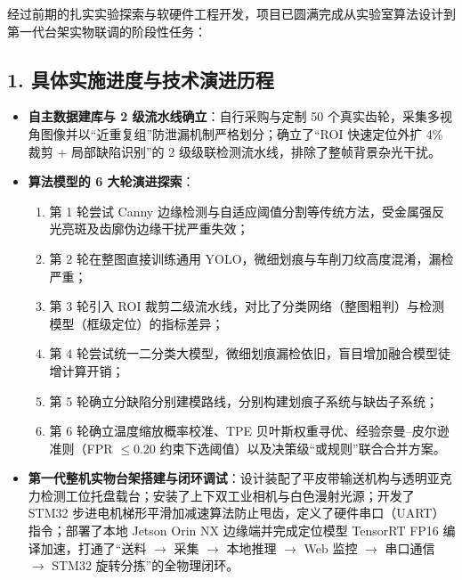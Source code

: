 经过前期的扎实实验探索与软硬件工程开发，项目已圆满完成从实验室算法设计到第一代台架实物联调的阶段性任务：

\subsection*{1. 具体实施进度与技术演进历程}
\begin{itemize}
    \item \textbf{自主数据建库与 2 级流水线确立}：自行采购与定制 50 个真实齿轮，采集多视角图像并以“近重复组”防泄漏机制严格划分；确立了“ROI 快速定位外扩 4\% 裁剪 + 局部缺陷识别”的 2 级级联检测流水线，排除了整帧背景杂光干扰。
    \item \textbf{算法模型的 6 大轮演进探索}：
    \begin{enumerate}
        \item 第 1 轮尝试 Canny 边缘检测与自适应阈值分割等传统方法，受金属强反光亮斑及齿廓伪边缘干扰严重失效；
        \item 第 2 轮在整图直接训练通用 YOLO，微细划痕与车削刀纹高度混淆，漏检严重；
        \item 第 3 轮引入 ROI 裁剪二级流水线，对比了分类网络（整图粗判）与检测模型（框级定位）的指标差异；
        \item 第 4 轮尝试统一二分类大模型，微细划痕漏检依旧，盲目增加融合模型徒增计算开销；
        \item 第 5 轮确立分缺陷分别建模路线，分别构建划痕子系统与缺齿子系统；
        \item 第 6 轮确立温度缩放概率校准、TPE 贝叶斯权重寻优、经验奈曼–皮尔逊准则（FPR $\le 0.20$ 约束下选阈值）以及决策级“或规则”联合合并方案。
    \end{enumerate}
    \item \textbf{第一代整机实物台架搭建与闭环调试}：设计装配了平皮带输送机构与透明亚克力检测工位托盘载台；安装了上下双工业相机与白色漫射光源；开发了 STM32 步进电机梯形平滑加减速算法防止甩齿，定义了硬件串口（UART）指令；部署了本地 Jetson Orin NX 边缘端并完成定位模型 TensorRT FP16 编译加速，打通了“送料 $\rightarrow$ 采集 $\rightarrow$ 本地推理 $\rightarrow$ Web 监控 $\rightarrow$ 串口通信 $\rightarrow$ STM32 旋转分拣”的全物理闭环。
\end{itemize}

